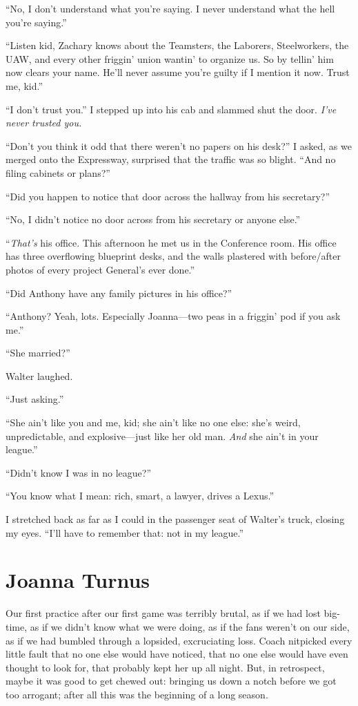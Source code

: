 ``No, I don't understand what you're saying. I never understand what the
hell you're saying.''

``Listen kid, Zachary knows about the Teamsters, the Laborers,
Steelworkers, the UAW, and every other friggin' union wantin' to
organize us. So by tellin' him now clears your name. He'll never assume
you're guilty if I mention it now. Trust me, kid.''

``I don't trust you.'' I stepped up into his cab and slammed shut the
door. \emph{I've never trusted you.}

``Don't you think it odd that there weren't no papers on his desk?'' I
asked, as we merged onto the Expressway, surprised that the traffic was
so blight. ``And no filing cabinets or plans?''

``Did you happen to notice that door across the hallway from his
secretary?''

``No, I didn't notice no door across from his secretary or anyone
else.''

``\emph{That's} his office. This afternoon he met us in the Conference
room. His office has three overflowing blueprint desks, and the walls
plastered with before/after photos of every project General's ever
done.''

``Did Anthony have any family pictures in his office?''

``Anthony? Yeah, lots. Especially Joanna---two peas in a friggin' pod if
you ask me.''

``She married?''

Walter laughed.

``Just asking.''

``She ain't like you and me, kid; she ain't like no one else: she's
weird, unpredictable, and explosive---just like her old man. \emph{And}
she ain't in your league.''

``Didn't know I was in no league?''

``You know what I mean: rich, smart, a lawyer, drives a Lexus.''

I stretched back as far as I could in the passenger seat of Walter's
truck, closing my eyes. ``I'll have to remember that: not in my
league.''

\chapter{Joanna Turnus}

\titlemark

Our first practice after our first game was terribly brutal, as if we
had lost big-time, as if we didn't know what we were doing, as if the
fans weren't on our side, as if we had bumbled through a lopsided,
excruciating loss. Coach nitpicked every little fault that no one else
would have noticed, that no one else would have even thought to look
for, that probably kept her up all night. But, in retrospect, maybe it
was good to get chewed out: bringing us down a notch before we got too
arrogant; after all this was the beginning of a long season.

